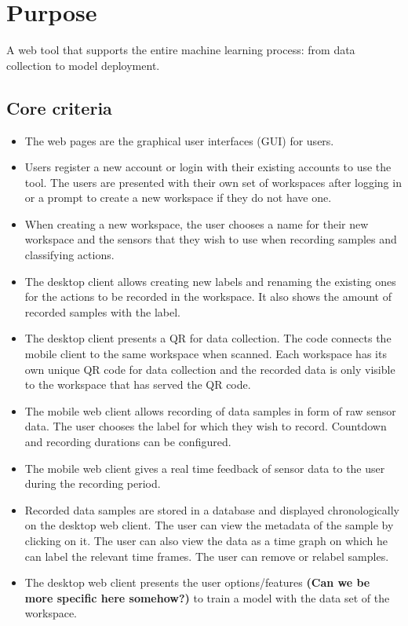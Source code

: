 \section{Purpose}
A web tool that supports the entire machine learning process: from data collection to model deployment.

\subsection{Core criteria}
\begin{itemize}
    \item The web pages are the graphical user interfaces (GUI) for users.
    \item Users register a new account or login with their existing accounts to use the tool. The users are presented with their own set of workspaces after logging in or a prompt to create a new workspace if they do not have one.
    \item When creating a new workspace, the user chooses a name for their new workspace and the sensors that they wish to use when recording samples and classifying actions.
    \item The desktop client allows creating new labels and renaming the existing ones for the actions to be recorded in the workspace. It also shows the amount of recorded samples with the label. 
    \item The desktop client presents a QR for data collection. The code connects the mobile client to the same \gls{workspace} when scanned. Each workspace has its own unique QR code for data collection and the recorded data is only visible to the workspace that has served the QR code.
    \item The mobile web client allows recording of data samples in form of raw sensor data. The user chooses the label for which they wish to record. Countdown and recording durations can be configured.
    \item The mobile web client gives a real time feedback of sensor data to the user during the recording period.
    \item Recorded data samples are stored in a database and displayed chronologically on the desktop web client. The user can view the metadata of the sample by clicking on it. The user can also view the data as a time graph on which he can label the relevant time frames. The user can remove or relabel samples.
    \item The desktop web client presents the user options/features \textbf{(Can we be more specific here somehow?)} to train a model with the data set of the workspace.

\end{itemize}
